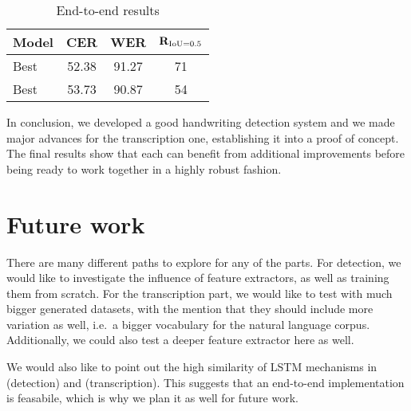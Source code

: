 \begin{table}\begin{tabular}{| l | *3{c |}}\hline
	\bf Model     & \bf CER & \bf WER & \(\mathbf{R}_{\operatorname{IoU} = 0.5}\)\\\hline
	Best \FRCNN{} & 52.38   & 91.27   & 71\\
	Best \CTPN{}  & 53.73   & 90.87   & 54\\\hline
\end{tabular}
\caption{End-to-end results}\label{tab:e2e_results}
\end{table}

In conclusion, we developed a good handwriting detection system and we made major advances for the transcription one, establishing it into a proof of concept. The final results show that each can benefit from additional improvements before being ready to work together in a highly robust fashion.

\section{Future work}
There are many different paths to explore for any of the parts. For detection, we would like to investigate the influence of feature extractors, as well as training them from scratch. For the transcription part, we would like to test with much bigger generated datasets, with the mention that they should include more variation as well, i.e.\ a bigger vocabulary for the natural language corpus. Additionally, we could also test a deeper feature extractor here as well.

We would also like to point out the high similarity of LSTM mechanisms in \CTPN{} (detection) and \CRNN{} (transcription). This suggests that an end-to-end implementation is feasabile, which is why we plan it as well for future work.


